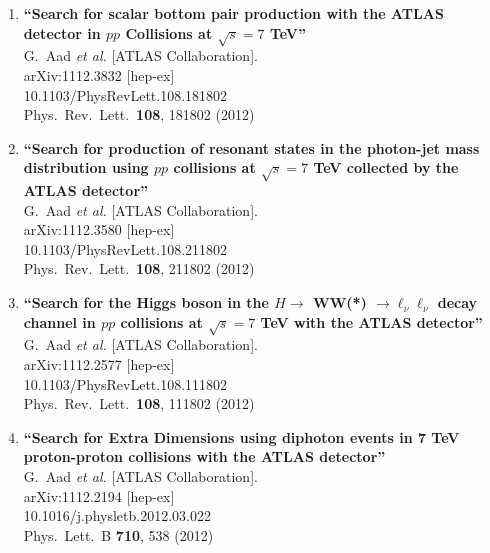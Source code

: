 \documentclass{article}
\begin{document}
\begin{enumerate}
\item%
{\bf ``Search for scalar bottom pair production with the ATLAS detector in $pp$ Collisions at $\sqrt{s}=7$ TeV''}
  \\{}G.~Aad {\it et al.}  [ATLAS Collaboration].
  \\{}arXiv:1112.3832 [hep-ex]
    \\{}10.1103/PhysRevLett.108.181802
\\{}Phys.\ Rev.\ Lett.\  {\bf 108}, 181802 (2012) %


\item%
{\bf ``Search for production of resonant states in the photon-jet mass distribution using $pp$ collisions at $\sqrt{s}=7$ TeV collected by the ATLAS detector''}
  \\{}G.~Aad {\it et al.}  [ATLAS Collaboration].
  \\{}arXiv:1112.3580 [hep-ex]
    \\{}10.1103/PhysRevLett.108.211802
\\{}Phys.\ Rev.\ Lett.\  {\bf 108}, 211802 (2012) %


\item%
{\bf ``Search for the Higgs boson in the $H \to$ WW(*) $\to \ell_\nu\ell_\nu$ decay channel in $pp$ collisions at $\sqrt{s}=7$ TeV with the ATLAS detector''}
  \\{}G.~Aad {\it et al.}  [ATLAS Collaboration].
  \\{}arXiv:1112.2577 [hep-ex]
    \\{}10.1103/PhysRevLett.108.111802
\\{}Phys.\ Rev.\ Lett.\  {\bf 108}, 111802 (2012) %


\item%
{\bf ``Search for Extra Dimensions using diphoton events in 7 TeV proton-proton collisions with the ATLAS detector''}
  \\{}G.~Aad {\it et al.}  [ATLAS Collaboration].
  \\{}arXiv:1112.2194 [hep-ex]
    \\{}10.1016/j.physletb.2012.03.022
\\{}Phys.\ Lett.\ B {\bf 710}, 538 (2012) %



\end{enumerate}
\end{document}

